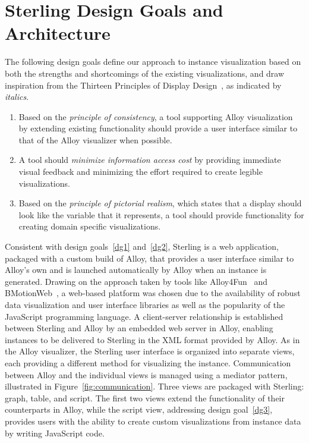 \documentclass[runningheads]{llncs}
\begin{document}
\section{Sterling Design Goals and Architecture}
\label{sterling}

The following design goals define our approach to instance visualization based on both the strengths and shortcomings of the existing visualizations, and draw inspiration from the Thirteen Principles of Display Design~\cite{wickens2003}, as indicated by \emph{italics}.

\begin{enumerate}
    \item \label{dg1} Based on the \emph{principle of consistency}, a tool supporting Alloy visualization by extending existing functionality should provide a user interface similar to that of the Alloy visualizer when possible.
    \item \label{dg2} A tool should \emph{minimize information access cost} by providing immediate visual feedback and minimizing the effort required to create legible visualizations.
    \item \label{dg3} Based on the \emph{principle of pictorial realism}, which states that a display should look like the variable that it represents, a tool should provide functionality for creating domain specific visualizations.
\end{enumerate}

Consistent with design goals~\ref{dg1} and~\ref{dg2}, Sterling is a web application, packaged with a custom build of Alloy, that provides a user interface similar to Alloy's own and is launched automatically by Alloy when an instance is generated. 
Drawing on the approach taken by tools like Alloy4Fun~\cite{macedo2019} and BMotionWeb~\cite{ladenberger2016}, a web-based platform was chosen due to the availability of robust data visualization and user interface libraries as well as the popularity of the JavaScript programming language.
A client-server relationship is established between Sterling and Alloy by an embedded web server in Alloy, enabling instances to be delivered to Sterling in the XML format provided by Alloy. 
As in the Alloy visualizer, the Sterling user interface is organized into separate views, each providing a different method for visualizing the instance. 
Communication between Alloy and the individual views is managed using a mediator pattern, illustrated in Figure~\ref{fig:communication}. Three views are packaged with Sterling: graph, table, and script. The first two views extend the functionality of their counterparts in Alloy, while the script view, addressing design goal~\ref{dg3}, provides users with the ability to create custom visualizations from instance data by writing JavaScript code.
\end{document}
